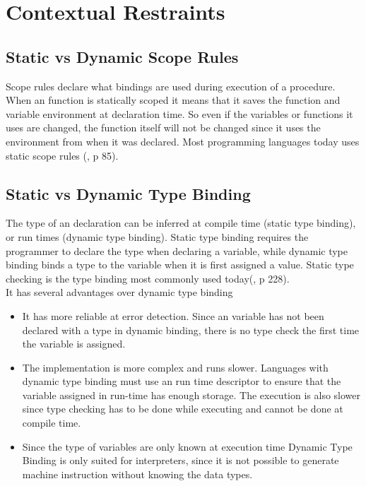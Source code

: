 \section{Contextual Restraints}
\subsection*{Static vs Dynamic Scope Rules}
Scope rules declare what bindings are used during execution of a procedure.
When an function is statically scoped it means that it saves the function and variable environment at declaration time. So even if the variables or functions it uses are changed, the function itself will not be changed since it uses the environment from when it was declared. Most programming languages today uses static scope rules (\cite{syntax-and-semantics}, p 85). 
\subsection*{Static vs Dynamic Type Binding }
The type of an declaration can be inferred at compile time (static type binding), or run times (dynamic type binding). Static type binding requires the programmer to declare the type when declaring a variable, while dynamic type binding binds a type to the variable when it is first assigned a value. Static type checking is the type binding most commonly used today(\cite{conceptsOfProgrammingLanguages}, p 228). \\ 
It has several advantages over dynamic type binding
\begin{itemize}
    \item It has more reliable at error detection. Since an variable has not been declared with a type in dynamic binding, there is no type check the first time the variable is assigned.
    \item The implementation is more complex and runs slower. Languages with dynamic type binding must use an run time descriptor to ensure that the variable assigned in run-time has enough storage.
    The execution is also slower since type checking has to be done while executing and cannot be done at compile time.
    \item Since the type of variables are only known at execution time Dynamic Type Binding is only suited for interpreters, since it is not possible to generate machine instruction without knowing the data types.
\end{itemize}


